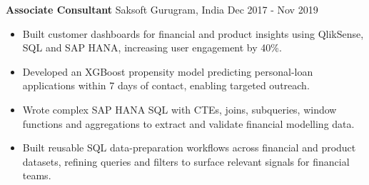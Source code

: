 \documentclass[10pt,a4paper]{article}
\newcommand{\role}[4]{\textbf{#1} \textbar{} #2 \hfill #3 \textbar{} #4\par}
\begin{document}
\vspace{3pt}
\role{Associate Consultant}{Saksoft}{Gurugram, India}{Dec 2017 - Nov 2019}
\begin{itemize}
  \item Built customer dashboards for financial and product insights using QlikSense, SQL and SAP HANA, increasing user engagement by 40\%.
  \item Developed an XGBoost propensity model predicting personal-loan applications within 7 days of contact, enabling targeted outreach.
  \item Wrote complex SAP HANA SQL with CTEs, joins, subqueries, window functions and aggregations to extract and validate financial modelling data.
  \item Built reusable SQL data-preparation workflows across financial and product datasets, refining queries and filters to surface relevant signals for financial teams.
\end{itemize}
\end{document}
